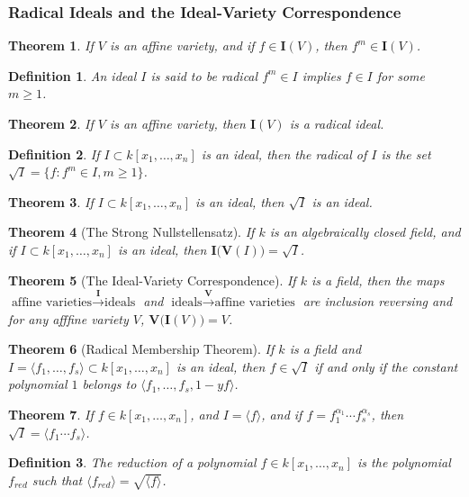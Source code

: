 \documentclass{article}
\theoremstyle{mystyle}
\newtheorem{theorem}{Theorem}[section]
\newtheorem{definition}{Definition}[section]
\begin{document}
\subsubsection{Radical Ideals and the Ideal-Variety Correspondence}
\begin{theorem}
If $V$ is an affine variety, and if $f\in \textbf{I}(V)$, then $f^m\in \textbf{I}(V)$.
\end{theorem}
\begin{definition}
An ideal $I$ is said to be radical $f^m \in I$ implies $f\in I$ for some $m\geq 1$.
\end{definition}
\begin{theorem}
If $V$ is an affine variety, then $\textbf{I}(V)$ is a radical ideal.
\end{theorem}
\begin{definition}
If $I\subset k[x_1,\hdots ,x_n]$ is an ideal, then the radical of $I$ is the set $\sqrt{I} = \{f: f^m \in I, m \geq 1\}$.
\end{definition}
\begin{theorem}
If $I\subset k[x_1,\hdots ,x_n]$ is an ideal, then $\sqrt{I}$ is an ideal.
\end{theorem}
\begin{theorem}[The Strong Nullstellensatz]
If $k$ is an algebraically closed field, and if $I\subset k[x_1,\hdots ,x_n]$ is an ideal, then $\textbf{I}\big(\mathbf{V}(I)\big) = \sqrt{I}$.
\end{theorem}
\begin{theorem}[The Ideal-Variety Correspondence]
If $k$ is a field, then the maps $\textrm{affine varieties} \overset{\textbf{I}}\rightarrow \textrm{ideals}$ and $\textrm{ideals} \overset{\mathbf{V}}\rightarrow \textrm{affine varieties}$ are inclusion reversing and for any afffine variety $V$, $\mathbf{V}\big(\textbf{I}(V)\big) = V$.
\end{theorem}
\begin{theorem}[Radical Membership Theorem]
If $k$ is a field and $I=\langle f_1,\hdots, f_s\rangle\subset k[x_1,\hdots ,x_n]$ is an ideal, then $f\in \sqrt{I}$ if and only if the constant polynomial $1$ belongs to $\langle f_1,\hdots, f_s, 1-yf\rangle$.
\end{theorem}
\begin{theorem}
If $f\in k[x_1,\hdots ,x_n]$, and $I = \langle f\rangle$, and if $f = f_1^{\alpha_1}\cdots f_s^{\alpha_s}$, then $\sqrt{I} = \langle f_1\cdots f_s\rangle$.
\end{theorem}
\begin{definition}
The reduction of a polynomial $f\in k[x_1,\hdots ,x_n]$ is the polynomial $f_{red}$ such that $\langle f_{red}\rangle = \sqrt{\langle f\rangle}$.
\end{definition}
\end{document}
